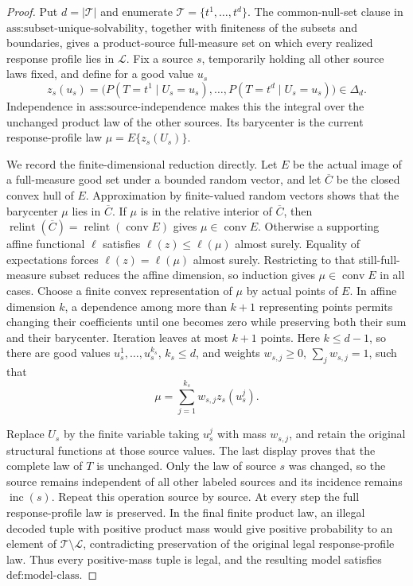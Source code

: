 \documentclass{article}
\begin{document}
\begin{proof}
Put \(d=|\mathcal T|\) and enumerate \(\mathcal T=\{t^1,\ldots,t^d\}\).  The common-null-set clause in \(\text{ass:subset-unique-solvability}\), together with finiteness of the subsets and boundaries, gives a product-source full-measure set on which every realized response profile lies in \(\mathcal L\).  Fix a source \(s\), temporarily holding all other source laws fixed, and define for a good value \(u_s\)
\[
 z_s(u_s)=\bigl(P(T=t^1\mid U_s=u_s),\ldots,P(T=t^d\mid U_s=u_s)\bigr)\in\Delta_d.
\]
Independence in \(\text{ass:source-independence}\) makes this the integral over the unchanged product law of the other sources.  Its barycenter is the current response-profile law \(\mu=E\{z_s(U_s)\}\).

We record the finite-dimensional reduction directly.  Let \(E\) be the actual image of a full-measure good set under a bounded random vector, and let \(\overline C\) be the closed convex hull of \(E\).  Approximation by finite-valued random vectors shows that the barycenter \(\mu\) lies in \(\overline C\).  If \(\mu\) is in the relative interior of \(\overline C\), then \(\operatorname{relint}(\overline C)=\operatorname{relint}(\operatorname{conv}E)\) gives \(\mu\in\operatorname{conv}E\).  Otherwise a supporting affine functional \(\ell\) satisfies \(\ell(z)\le\ell(\mu)\) almost surely.  Equality of expectations forces \(\ell(z)=\ell(\mu)\) almost surely.  Restricting to that still-full-measure subset reduces the affine dimension, so induction gives \(\mu\in\operatorname{conv}E\) in all cases.  Choose a finite convex representation of \(\mu\) by actual points of \(E\).  In affine dimension \(k\), a dependence among more than \(k+1\) representing points permits changing their coefficients until one becomes zero while preserving both their sum and their barycenter.  Iteration leaves at most \(k+1\) points.  Here \(k\le d-1\), so there are good values \(u_s^1,\ldots,u_s^{k_s}\), \(k_s\le d\), and weights \(w_{s,j}\ge0\), \(\sum_jw_{s,j}=1\), such that
\[
 \mu=\sum_{j=1}^{k_s}w_{s,j}z_s(u_s^j).
\]

Replace \(U_s\) by the finite variable taking \(u_s^j\) with mass \(w_{s,j}\), and retain the original structural functions at those source values.  The last display proves that the complete law of \(T\) is unchanged.  Only the law of source \(s\) was changed, so the source remains independent of all other labeled sources and its incidence remains \(\operatorname{inc}(s)\).  Repeat this operation source by source.  At every step the full response-profile law is preserved.  In the final finite product law, an illegal decoded tuple with positive product mass would give positive probability to an element of \(\mathcal T\setminus\mathcal L\), contradicting preservation of the original legal response-profile law.  Thus every positive-mass tuple is legal, and the resulting model satisfies \(\text{def:model-class}\).


\end{proof}
\end{document}
